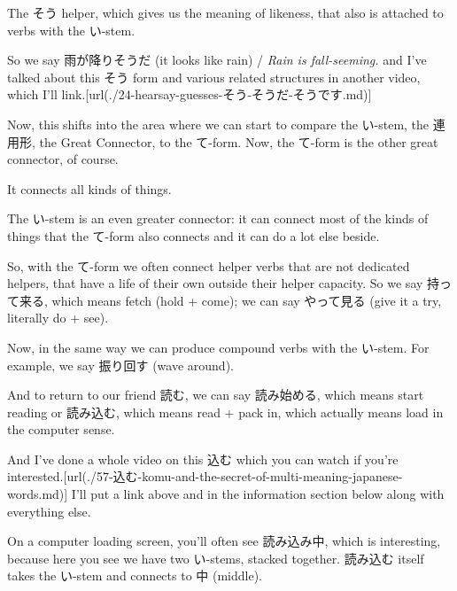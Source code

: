 \thinrule

The そう helper, which gives us the meaning of likeness, that also is attached to verbs with the い-stem.

{}

So we say 雨が降りそうだ (it looks like rain) / {\em Rain is fall-seeming.} and I've talked about this そう form and various related structures in another video, which I'll link.\goto{{[}24{]}}[url(./24-hearsay-guesses-そう-そうだ-そうです.md)]

\startsectionlevel[title={連用形 connector & the て-form connector},reference={連用形-connector-the-て-form-connector}]

Now, this shifts into the area where we can start to compare the い-stem, the 連用形, the Great Connector, to the て-form. Now, the て-form is the other great connector, of course.

It connects all kinds of things.

{}

The い-stem is an even greater connector: it can connect most of the kinds of things that the て-form also connects and it can do a lot else beside.

So, with the て-form we often connect helper verbs that are not dedicated helpers, that have a life of their own outside their helper capacity. So we say 持って来る, which means fetch (hold + come); we can say やって見る (give it a try, literally do + see).

\startsectionlevel[title={Compound verbs},reference={compound-verbs}]

Now, in the same way we can produce compound verbs with the い-stem. For example, we say 振り回す (wave around).

And to return to our friend 読む, we can say 読み始める, which means start reading or 読み込む, which means read + pack in, which actually means load in the computer sense.

{}

And I've done a whole video on this 込む which you can watch if you're interested.\goto{{[}57{]}}[url(./57-込む-komu-and-the-secret-of-multi-meaning-japanese-words.md)] I'll put a link above and in the information section below along with everything else.

On a computer loading screen, you'll often see 読み込み中, which is interesting, because here you see we have two い-stems, stacked together. 読み込む itself takes the い-stem and connects to 中 (middle).

